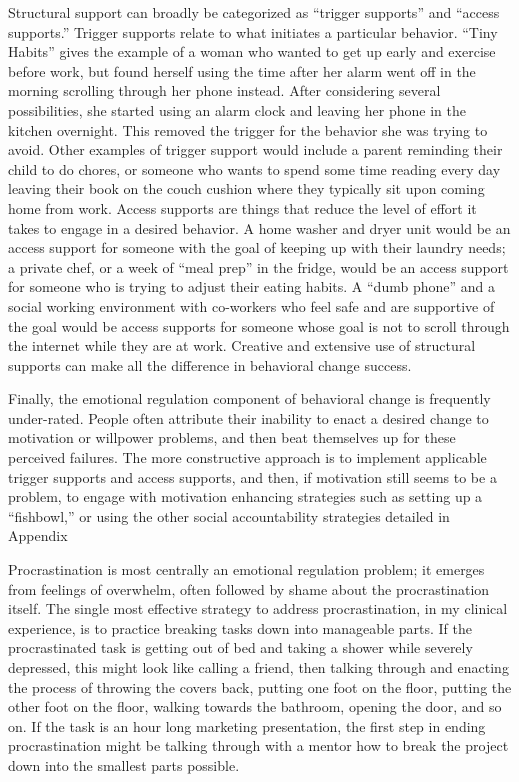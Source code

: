 \documentclass[12pt,letterpaper]{book}
\begin{document}
Structural support can broadly be categorized as “trigger supports” and “access supports.” Trigger supports relate to what initiates a particular behavior. “Tiny Habits” gives the example of a woman who wanted to get up early and exercise before work, but found herself using the time after her alarm went off in the morning scrolling through her phone instead. After considering several possibilities, she started using an alarm clock and leaving her phone in the kitchen overnight. This removed the trigger for the behavior she was trying to avoid. Other examples of trigger support would include a parent reminding their child to do chores, or someone who wants to spend some time reading every day leaving their book on the couch cushion where they typically sit upon coming home from work. Access supports are things that reduce the level of effort it takes to engage in a desired behavior. A home washer and dryer unit would be an access support for someone with the goal of keeping up with their laundry needs; a private chef, or a week of “meal prep” in the fridge, would be an access support for someone who is trying to adjust their eating habits. A “dumb phone” and a social working environment with co-workers who feel safe and are supportive of the goal would be access supports for someone whose goal is not to scroll through the internet while they are at work. Creative and extensive use of structural supports can make all the difference in behavioral change success.

Finally, the emotional regulation component of behavioral change is frequently under-rated. People often attribute their inability to enact a desired change to motivation or willpower problems, and then beat themselves up for these perceived failures. The more constructive approach is to implement applicable trigger supports and access supports, and then, if motivation still seems to be a problem, to engage with motivation enhancing strategies such as setting up a “fishbowl,” or using the other social accountability strategies detailed in Appendix \todo{}

Procrastination is most centrally an emotional regulation problem; it emerges from feelings of overwhelm, often followed by shame about the procrastination itself. The single most effective strategy to address procrastination, in my clinical experience, is to practice breaking tasks down into manageable parts. If the procrastinated task is getting out of bed and taking a shower while severely depressed, this might look like calling a friend, then talking through and enacting the process of throwing the covers back, putting one foot on the floor, putting the other foot on the floor, walking towards the bathroom, opening the door, and so on. If the task is an hour long marketing presentation, the first step in ending procrastination might be talking through with a mentor how to break the project down into the smallest parts possible.
\end{document}
